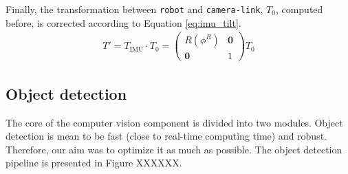 Finally, the transformation between \texttt{robot} and \texttt{camera-link}, $T_0$, computed before, is corrected according to Equation \ref{eq:imu_tilt}.
\begin{align}
\label{eq:imu_tilt}
T' = T_{\text{IMU}} \cdot T_0 = 
\begin{pmatrix}
R(\phi^R) & \textbf{0}\\
\textbf{0} & 1 
\end{pmatrix} T_0
\end{align}

\subsection{Object detection}
The core of the computer vision component is divided into two modules. Object detection is mean to be fast (close to real-time computing time) and robust. Therefore, our aim was to optimize it as much as possible. The object detection pipeline is presented in Figure XXXXXX.


